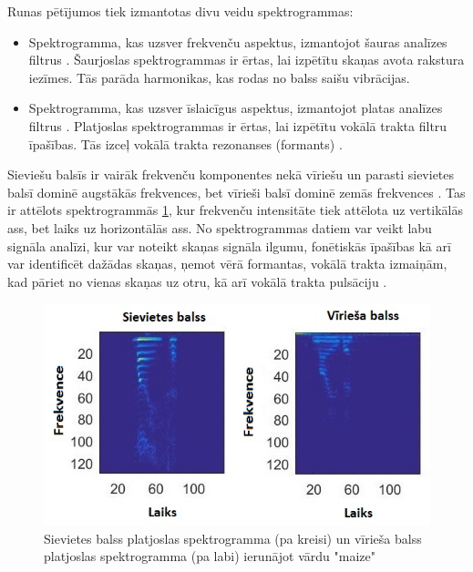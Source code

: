 \documentclass[12pt,paper=A4]{report}
\begin{document}
Runas pētījumos tiek izmantotas divu veidu spektrogrammas:
\begin{itemize}

\item Spektrogramma, kas uzsver frekvenču
aspektus, izmantojot šauras analīzes filtrus \cite{dtw21}. Šaurjoslas spektrogrammas ir ērtas, lai izpētītu skaņas avota rakstura iezīmes. Tās parāda harmonikas, kas rodas no balss saišu vibrācijas.

\item Spektrogramma, kas uzsver īslaicīgus aspektus, izmantojot platas analīzes filtrus \cite{dtw21}. Platjoslas spektrogrammas ir ērtas, lai izpētītu vokālā trakta filtru īpašības. Tās izceļ vokālā trakta rezonanses (formants) \cite{dtw21}. 

\end{itemize}
Sieviešu balsīs ir vairāk frekvenču komponentes nekā vīriešu un parasti sievietes balsī dominē augstākās frekvences, bet vīrieši balsī dominē zemās frekvences \cite{FMVoice}. Tas ir attēlots spektrogrammās \ref{fm-m}, kur frekvenču intensitāte tiek attēlota uz vertikālās ass, bet laiks uz horizontālās ass.
No spektrogrammas datiem var veikt labu signāla analīzi, kur var noteikt skaņas signāla ilgumu, fonētiskās īpašības kā arī var identificēt dažādas skaņas, ņemot vērā formantas, vokālā trakta izmaiņām, kad pāriet no vienas skaņas uz otru, kā arī vokālā trakta pulsāciju \cite{http://www.cslu.ogi.edu/tutordemos/SpectrogramReading/spectrogram.html}.

\begin{figure}[H] \centering
\includegraphics[width=1.00\textwidth]{spectr} 
\caption{Sievietes balss platjoslas spektrogramma (pa kreisi) un vīrieša balss platjoslas spektrogramma (pa labi) ierunājot vārdu "maize" 
\cite{matlab}} \label{fm-m} 
\end{figure}
\end{document}
